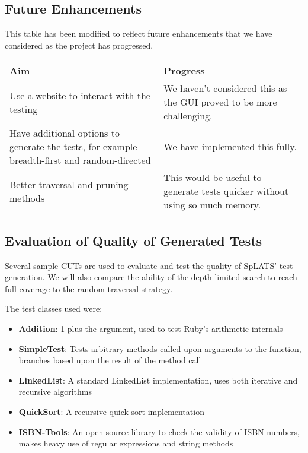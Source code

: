   \subsection{Future Enhancements}
    This table has been modified to reflect future enhancements that we have considered as the project has progressed.
    
    \begin{tabular}{|p{}|p{}|}
    \hline
    \textbf{Aim} & \textbf{Progress} \\
    \hline
    Use a website to interact with the testing &
    We haven't considered this as the GUI proved to be more challenging. \\
    \hline
    Have additional options to generate the tests, for example breadth-first and random-directed &
    We have implemented this fully. \\
    \hline
    Better traversal and pruning methods &
    This would be useful to generate tests quicker without using so much memory. \\
    \hline
    \end{tabular}

  \subsection{Evaluation of Quality of Generated Tests}
    Several sample CUTs are used to evaluate and test the quality of SpLATS'
test generation. We will also compare the ability of the depth-limited search to
reach full coverage to the random traversal strategy.

    The test classes used were:
    \begin{itemize}
      \item \textbf{Addition}: 1 plus the argument, used to test Ruby's arithmetic
internals
      \item \textbf{SimpleTest}: Tests arbitrary methods called upon arguments to the
function, branches based upon the result of the method call
      \item \textbf{LinkedList}: A standard LinkedList implementation, uses both
iterative and recursive algorithms
      \item \textbf{QuickSort}: A recursive quick sort implementation
      \item \textbf{ISBN-Tools}: An open-source library to check the validity of ISBN
numbers, makes heavy use of regular expressions and string methods
    \end{itemize}

